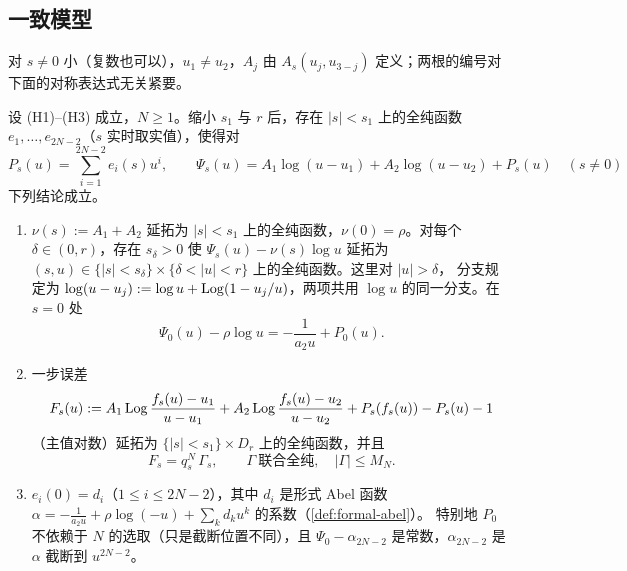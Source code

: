 \subsection{一致模型}
对 $s\ne0$ 小（复数也可以），$u_1\ne u_2$，$A_j$ 由 $A_s(u_j,u_{3-j})$ 定义；两根的编号对下面的对称表达式无关紧要。

\begin{lemma}[一致模型]\label{lem:uniform-model}
设 (H1)--(H3) 成立，$N\ge1$。缩小 $s_1$ 与 $r$ 后，存在 $|s|<s_1$ 上的全纯函数 $e_1,\dots,e_{2N-2}$（$s$ 实时取实值），使得对
\[
 P_s(u)=\sum_{i=1}^{2N-2}e_i(s)u^i,\qquad
 \Psi_s(u)=A_1\log(u-u_1)+A_2\log(u-u_2)+P_s(u)\quad(s\ne0)
\]
下列结论成立。
\begin{enumerate}
\item $\nu(s):=A_1+A_2$ 延拓为 $|s|<s_1$ 上的全纯函数，$\nu(0)=\rho$。对每个 $\delta\in(0,r)$，存在 $s_\delta>0$ 使
  $\Psi_s(u)-\nu(s)\log u$ 延拓为 $(s,u)\in\{|s|<s_\delta\}\times\{\delta<|u|<r\}$ 上的全纯函数。这里对 $|u|>\delta$，
  分支规定为 $\log(u-u_j):=\log u+\operatorname{Log}(1-u_j/u)$，两项共用 $\log u$ 的同一分支。在 $s=0$ 处
  \[
   \Psi_0(u)-\rho\log u=-\frac1{a_2u}+P_0(u).
  \]
\item 一步误差
  \[
   F_s(u):=A_1\operatorname{Log}\frac{f_s(u)-u_1}{u-u_1}+A_2\operatorname{Log}\frac{f_s(u)-u_2}{u-u_2}+P_s(f_s(u))-P_s(u)-1
  \]
  （主值对数）延拓为 $\{|s|<s_1\}\times D_r$ 上的全纯函数，并且
  \[
   F_s=q_s^N\,\Gamma_s,\qquad \Gamma\ \text{联合全纯},\quad |\Gamma|\le M_N .
  \]
\item $e_i(0)=d_i$（$1\le i\le2N-2$），其中 $d_i$ 是形式 Abel 函数 $\alpha=-\frac1{a_2u}+\rho\log(-u)+\sum_kd_ku^k$ 的系数（\cref{def:formal-abel}）。
  特别地 $P_0$ 不依赖于 $N$ 的选取（只是截断位置不同），且 $\Psi_0-\alpha_{2N-2}$ 是常数，$\alpha_{2N-2}$ 是 $\alpha$ 截断到 $u^{2N-2}$。
\end{enumerate}
\end{lemma}

